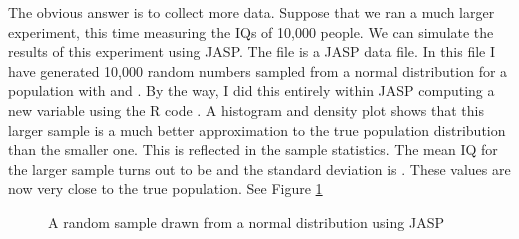 The obvious answer is to collect more data. Suppose that we ran a much larger experiment, this time measuring the IQs of 10,000 people. We can simulate the results of this experiment using JASP. The  file is a JASP data file. In this file I have generated 10,000 random numbers sampled from a normal distribution for a population with  and . By the way, I did this entirely within JASP computing a new variable using the R code . A histogram and density plot shows that this larger sample is a much better approximation to the true population distribution than the smaller one. This is reflected in the sample statistics. The mean IQ for the larger sample turns out to be  and the standard deviation is . These values are now very close to the true population. See Figure \ref{fig:iqsim}

\begin{figure}[p]
\begin{center}
\end{center}
\caption{A random sample drawn from a normal distribution using JASP}
\label{fig:iqsim}
\HR
\end{figure}

